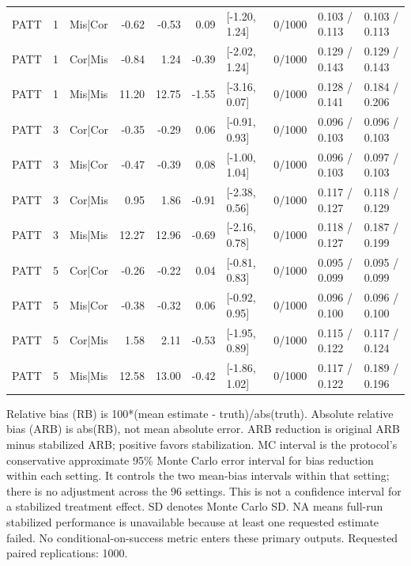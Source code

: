 \begin{table}
\begin{tabular}{lllr r r l r l l}
PATT & 1 & Mis|Cor & -0.62 & -0.53 & 0.09 & [-1.20, 1.24] & 0/1000 & 0.103 / 0.113 & 0.103 / 0.113 \\
PATT & 1 & Cor|Mis & -0.84 & 1.24 & -0.39 & [-2.02, 1.24] & 0/1000 & 0.129 / 0.143 & 0.129 / 0.143 \\
PATT & 1 & Mis|Mis & 11.20 & 12.75 & -1.55 & [-3.16, 0.07] & 0/1000 & 0.128 / 0.141 & 0.184 / 0.206 \\
PATT & 3 & Cor|Cor & -0.35 & -0.29 & 0.06 & [-0.91, 0.93] & 0/1000 & 0.096 / 0.103 & 0.096 / 0.103 \\
PATT & 3 & Mis|Cor & -0.47 & -0.39 & 0.08 & [-1.00, 1.04] & 0/1000 & 0.096 / 0.103 & 0.097 / 0.103 \\
PATT & 3 & Cor|Mis & 0.95 & 1.86 & -0.91 & [-2.38, 0.56] & 0/1000 & 0.117 / 0.127 & 0.118 / 0.129 \\
PATT & 3 & Mis|Mis & 12.27 & 12.96 & -0.69 & [-2.16, 0.78] & 0/1000 & 0.118 / 0.127 & 0.187 / 0.199 \\
PATT & 5 & Cor|Cor & -0.26 & -0.22 & 0.04 & [-0.81, 0.83] & 0/1000 & 0.095 / 0.099 & 0.095 / 0.099 \\
PATT & 5 & Mis|Cor & -0.38 & -0.32 & 0.06 & [-0.92, 0.95] & 0/1000 & 0.096 / 0.100 & 0.096 / 0.100 \\
PATT & 5 & Cor|Mis & 1.58 & 2.11 & -0.53 & [-1.95, 0.89] & 0/1000 & 0.115 / 0.122 & 0.117 / 0.124 \\
PATT & 5 & Mis|Mis & 12.58 & 13.00 & -0.42 & [-1.86, 1.02] & 0/1000 & 0.117 / 0.122 & 0.189 / 0.196 \\
\bottomrule
\end{tabular}
\vspace{0.5em}
\begin{minipage}{\textwidth}
\footnotesize
Relative bias (RB) is 100*(mean estimate - truth)/abs(truth). Absolute relative bias (ARB) is abs(RB), not mean absolute error. ARB reduction is original ARB minus stabilized ARB; positive favors stabilization. MC interval is the protocol's conservative approximate 95\% Monte Carlo error interval for bias reduction within each setting. It controls the two mean-bias intervals within that setting; there is no adjustment across the 96 settings. This is not a confidence interval for a stabilized treatment effect. SD denotes Monte Carlo SD. NA means full-run stabilized performance is unavailable because at least one requested estimate failed. No conditional-on-success metric enters these primary outputs. Requested paired replications: 1000.
\end{minipage}
\end{table}
